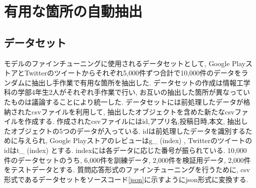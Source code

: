 

\section{有用な箇所の自動抽出}\label{extraction}
\subsection{データセット}\label{dataset}
モデルのファインチューニングに使用されるデータセットとして, Google PlayストアとTwitterのツイートからそれぞれ5,000件ずつ合計で10,000件のデータをランダムに抽出し手作業で有用な箇所を抽出した. データセットの作成は情報工学科の学部4年生2人がそれぞれ手作業で行い, お互いの抽出した箇所が異なっていたものは議論することにより統一した. 
データセットには前処理したデータが格納されたcsvファイルを利用して, 抽出したオブジェクトを含めた新たなcsvファイルを作成する. 作成されたcsvファイルにはid,アプリ名,投稿日時,本文, 抽出したオブジェクトの5つのデータが入っている. idは前処理したデータを識別するために与えられ, Google Playストアのレビューはg\_ (index) , Twitterのツイートのidはt\_ (index) とする.  indexには各データに応じた番号が振られている. 
10,000件のデータセットのうち, 6,000件を訓練データ, 2,000件を検証用データ, 2,000件をテストデータとする. 質問応答形式のファインチューニングを行うために, csv形式であるデータセットをソースコード\ref{json}に示すようにjson形式に変換する. 

